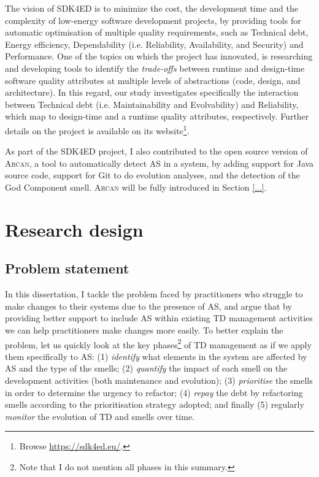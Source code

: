 The vision of SDK4ED is to minimize the cost, the development time and the complexity of low-energy software development projects, by providing tools for automatic optimisation of multiple quality requirements, such as Technical debt, Energy efficiency, Dependability (i.e. Reliability, Availability, and Security) and Performance. 
One of the topics on which the project has innovated, is researching and developing tools to identify the \textit{trade-offs} between runtime and design-time software quality attributes at multiple levels of abstractions (code, design, and architecture).
In this regard, our study investigates specifically the interaction between Technical debt (i.e. Maintainability and Evolvability) and Reliability, which map to design-time and a runtime quality attributes, respectively. Further details on the project is available on its website\footnote{Browse \url{https://sdk4ed.eu/}.}.

As part of the SDK4ED project, I also contributed to the open source version of \textsc{Arcan}, a tool to automatically detect AS in a system, by adding support for Java source code, support for Git to do evolution analyses, and the detection of the God Component smell.
\textsc{Arcan} will be fully introduced in Section \ref{...}.

\section{Research design}\label{sec:intro:research-design}
\subsection{Problem statement}\label{sec:intro:problem-statement}
In this dissertation, I tackle the problem faced by practitioners who struggle to make changes to their systems due to the presence of AS, and argue that by providing better support to include AS within existing TD management activities we can help practitioners make changes more easily. %
To better explain the problem, let us quickly look at the key phases\footnote{Note that I do not mention all phases in this summary.} of TD management \cite{Li2015} as if we apply them specifically to AS: (1) \emph{identify} what elements in the system are affected by AS and the type of the smells; (2) \emph{quantify} the impact of each smell on the development activities (both maintenance and evolution); (3) \emph{prioritise} the smells in order to determine the urgency to refactor; (4) \emph{repay} the debt by refactoring smells according to the prioritisation strategy adopted; and finally (5) regularly \emph{monitor} the evolution of TD and smells over time.

